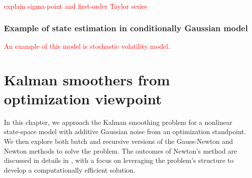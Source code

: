 \documentclass[dissertation,math,vertlayout,pdfa,colorlinks,nologo]{aaltoseries}
\begin{document}
\textcolor{red}{explain sigma-point and first-order Taylor series}


\subsection{Example of state estimation in conditionally Gaussian model}
\textcolor{red}{An example of this model is stochastic volatility model.}

\chapter{Kalman smoothers from optimization viewpoint}
\label{ch:KS-optimization}
In this chapter, we approach the Kalman smoothing problem for a nonlinear state-space model with additive Gaussian noise from an optimization standpoint. We then explore both batch and recursive versions of the Gauss-Newton and Newton methods to solve the problem. The outcomes of Newton’s method are discussed in details in , with a focus on leveraging the problem's structure to develop a computationally efficient solution.
\end{document}
